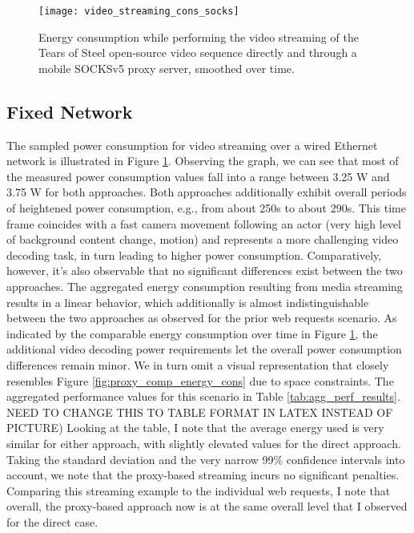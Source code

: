 \begin{figure}
\centering
\texttt{[image: video\_streaming\_cons\_socks]}
\caption{Energy consumption while performing the video streaming of the
Tears of Steel open-source video sequence directly and through a mobile
SOCKSv5 proxy server, smoothed over time.}
\label{fig:video_streaming_cons_socks}
\end{figure}

\subsection*{Fixed Network}
The sampled power consumption for video
streaming over a wired Ethernet network is illustrated in Figure \ref{fig:video_streaming_cons_socks}. Observing the graph, we can
see that most of the measured power consumption values
fall into a range between 3.25 W and 3.75 W for both
approaches. Both approaches additionally exhibit overall periods
of heightened power consumption, e.g., from about
250s to about 290s. This time frame coincides with a fast
camera movement following an actor (very high level of
background content change, motion) and represents a more
challenging video decoding task, in turn leading to higher
power consumption. Comparatively, however, it's also observable that no
significant differences exist between the two approaches. The aggregated
energy consumption resulting from media streaming
results in a linear behavior, which additionally is almost
indistinguishable between the two approaches as observed
for the prior web requests scenario. As indicated by the
comparable energy consumption over time in Figure \ref{fig:video_streaming_cons_socks}, the
additional video decoding power requirements let the overall
power consumption differences remain minor. We in turn omit
a visual representation that closely resembles Figure \ref{fig:proxy_comp_energy_cons} due
to space constraints. The aggregated performance
values for this scenario in Table \ref{tab:agg_perf_results}. NEED TO CHANGE THIS TO TABLE FORMAT IN LATEX INSTEAD OF PICTURE) Looking at the table, I note that the average
energy used is very similar for either approach, with slightly
elevated values for the direct approach. Taking the standard
deviation and the very narrow 99\% confidence intervals into
account, we note that the proxy-based streaming incurs no
significant penalties. Comparing this streaming example to the
individual web requests, I note that overall, the proxy-based
approach now is at the same overall level that I observed
for the direct case.

